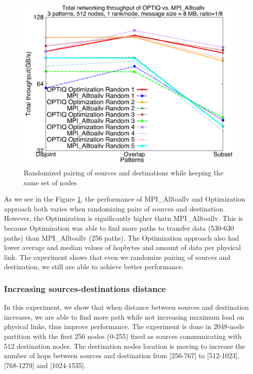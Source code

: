 \begin{figure}[!htb]
\vspace{-0.1in}
\centering
\includegraphics[scale=0.30]{figures/rand_opt_mpi.pdf}
\vspace{-0.1in}
\caption{Randomized pairing of sources and destinations while keeping the same set of nodes}
\vspace{-0.1in}
\label{fig:random}
\end{figure}

As we see in the Figure \ref{fig:random}, the performance of MPI\_Alltoallv and Optimization approach both varies when randomizing pairs of sources and destination. However, the Optimization is significantly higher thatn MPI\_Alltoallv. This is because Optimization was able to find more paths to transfer data (530-630 paths) than MPI\_Alltoallv (256 paths). The Optimization approach also had lower average and median values of hopbytes and amount of data per physical link. The experiment shows that even we randomize pairing of sources and destination, we still are able to achieve better performance.

\subsubsection{Increasing sources-destinations distance}

In this experiment, we show that when distance between sources and destination increases, we are able to find more path while not increasing maximum load on physical links, thus improve performance. The experiment is done in 2048-node partition with the first 256 nodes (0-255) fixed as sources communicating with 512 destination nodes. The destination nodes location is moving to increase the number of hops between sources and destination from [256-767] to [512-1023], [768-1279] and [1024-1535]. 

